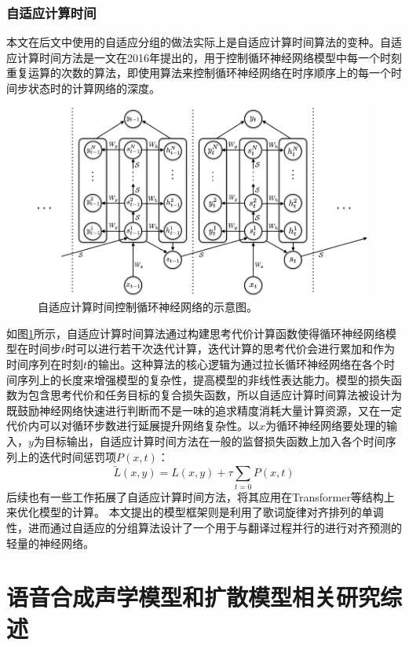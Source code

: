 \subsubsection{自适应计算时间}
本文在后文中使用的自适应分组的做法实际上是自适应计算时间算法的变种。自适应计算时间方法是\citet{act}一文在2016年提出的，用于控制循环神经网络模型中每一个时刻重复运算的次数的算法，即使用算法来控制循环神经网络在时序顺序上的每一个时间步状态时的计算网络的深度。
\begin{figure}[!ht]
  \includegraphics[width=0.99\textwidth]{figure/related/act.png}
  \caption{自适应计算时间控制循环神经网络的示意图。}
  \label{fig:act_rnn}
\end{figure}
如图\ref{fig:act_rnn}所示，自适应计算时间算法通过构建思考代价计算函数使得循环神经网络模型在时间步$t$时可以进行若干次迭代计算，迭代计算的思考代价会进行累加和作为时间序列在时刻$t$的输出。这种算法的核心逻辑为通过拉长循环神经网络在各个时间序列上的长度来增强模型的复杂性，提高模型的非线性表达能力。模型的损失函数为包含思考代价和任务目标的复合损失函数，所以自适应计算时间算法被设计为既鼓励神经网络快速进行判断而不是一味的追求精度消耗大量计算资源，又在一定代价内可以对循环步数进行延展提升网络复杂性。以$x$为循环神经网络要处理的输入，$y$为目标输出，自适应计算时间方法在一般的监督损失函数上加入各个时间序列上的迭代时间惩罚项$P(x,t)$：
\begin{equation*}
  \tilde{L}(x,y)=L(x,y)+\tau \sum_{t=0} P(x,t)
\end{equation*}
后续也有一些工作拓展了自适应计算时间方法，将其应用在Transformer等结构上来优化模型的计算。
本文提出的模型框架则是利用了歌词旋律对齐排列的单调性，进而通过自适应的分组算法设计了一个用于与翻译过程并行的进行对齐预测的轻量的神经网络。
\section{语音合成声学模型和扩散模型相关研究综述}
